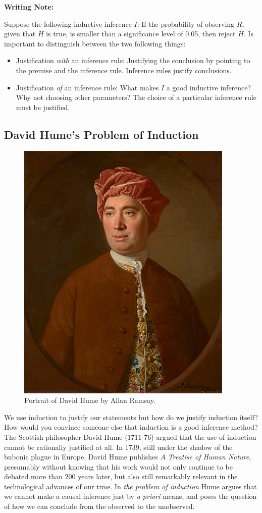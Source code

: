 \documentclass[
]{book}
\providecommand{\tightlist}{%
  \setlength{\itemsep}{0pt}\setlength{\parskip}{0pt}}
\begin{document}
\begin{tipbox}

\textbf{Writing Note:}

Suppose the following inductive inference \(I\): If the probability of observing \(R\), given that \(H\) is true, is smaller than a significance level of 0.05, then reject \(H\). Is important to distinguish between the two following things:

\begin{itemize}
\tightlist
\item
  Justification \emph{with} an inference rule: Justifying the conclusion by pointing to the premise and the inference rule. Inference rules justify conclusions.
\item
  Justification \emph{of} an inference rule: What makes \(I\) a good inductive inference? Why not choosing other parameters? The choice of a particular inference rule must be justified.
\end{itemize}

\end{tipbox}

\hypertarget{david-humes-problem-of-induction}{%
\subsection{David Hume's Problem of Induction}\label{david-humes-problem-of-induction}}

\begin{figure}  
 \begin{center}
    \includegraphics[width=.30\textwidth]{Figures/David_Hume.jpg}  
  \captionsetup{labelformat=empty}
  \caption{Portrait of David Hume by Allan Ramsay.} 
\end{center}
\end{figure}
\addtocounter{figure}{-1}

We use induction to justify our statements but how do we justify induction itself? How would you convince someone else that induction is a good inference method? The Scottish philosopher David Hume (1711-76) argued that the use of induction cannot be rationally justified at all. In 1739, still under the shadow of the bubonic plague in Europe, David Hume publishes \emph{A Treatise of Human Nature}, presumably without knowing that his work would not only continue to be debated more than 200 years later, but also still remarkably relevant in the technological advances of our time. In \emph{the problem of induction} Hume argues that we cannot make a causal inference just by \emph{a priori} means, and poses the question of how we can conclude from the observed to the unobserved.
\end{document}
